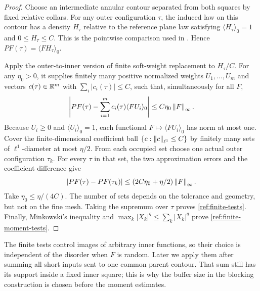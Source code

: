 \begin{proof}
Choose an intermediate annular contour separated from both squares by
fixed relative collars.  For any outer configuration $\tau$, the induced
law on this contour has a density $H_\tau$ relative to the reference
plane law satisfying $\langle H_\tau\rangle_0=1$ and
$0\le H_\tau\le C$.  This is the pointwise comparison used in
\cite[Proposition~4.1]{ReferenceIsing}.  Hence
$PF(\tau)=\langle FH_\tau\rangle_0$.

Apply the outer-to-inner version of finite soft-weight replacement
\cite[Lemma~3.3]{ReferenceIsing} to $H_\tau/C$.
For any $\eta_0>0$, it supplies finitely many positive normalized weights
$U_1,\ldots,U_m$ and vectors $c(\tau)\in\mathbb R^m$ with
$\sum_i|c_i(\tau)|\le C$, such that, simultaneously for all $F$,
\[
 \left|PF(\tau)-\sum_{i=1}^m c_i(\tau)
                                  \langle FU_i\rangle_0\right|
       \le C\eta_0\left\lVert F\right\rVert_\infty.
\]
Because $U_i\ge0$ and $\langle U_i\rangle_0=1$, each functional
$F\mapsto\langle FU_i\rangle_0$ has norm at most one.  Cover the
finite-dimensional coefficient ball $\{c:\left\lVert c\right\rVert_{\ell^1}\le C\}$ by finitely
many sets of $\ell^1$-diameter at most $\eta/2$.  From each occupied set
choose one actual outer configuration $\tau_k$.  For every $\tau$ in
that set, the two approximation errors and the coefficient difference give
\[
 |PF(\tau)-PF(\tau_k)|
       \le (2C\eta_0+\eta/2)\left\lVert F\right\rVert_\infty.
\]
Take $\eta_0\le\eta/(4C)$.  The number of sets depends on the tolerance
and geometry, but not on the fine mesh.  Taking the supremum over $\tau$
proves \eqref{ref:finite-tests}.  Finally, Minkowski's inequality and
$\max_k|X_k|^q\le\sum_k|X_k|^q$ prove
\eqref{ref:finite-moment-tests}.
\end{proof}

The finite tests control images of arbitrary inner functions, so their
choice is independent of the disorder when $F$ is random.  Later we apply
them after summing all short inputs sent to one common parent contour.
That sum still has its support inside a fixed inner square; this is why
the buffer size in the blocking construction is chosen before the moment
estimates.
